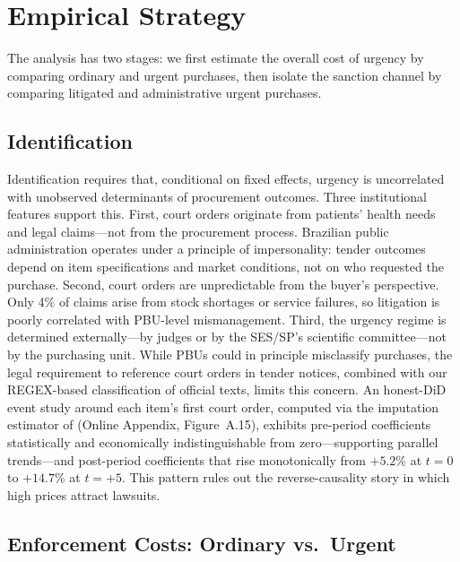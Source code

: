 \section{Empirical Strategy}
\label{sec:empirical}

The analysis has two stages: we first estimate the overall cost of urgency by comparing ordinary and urgent purchases, then isolate the sanction channel by comparing litigated and administrative urgent purchases.

\subsection{Identification}

Identification requires that, conditional on fixed effects, urgency is uncorrelated with unobserved determinants of procurement outcomes. Three institutional features support this. First, court orders originate from patients' health needs and legal claims---not from the procurement process. Brazilian public administration operates under a principle of impersonality: tender outcomes depend on item specifications and market conditions, not on who requested the purchase. Second, court orders are unpredictable from the buyer's perspective. Only 4\% of claims arise from stock shortages or service failures, so litigation is poorly correlated with PBU-level mismanagement. Third, the urgency regime is determined externally---by judges or by the SES/SP's scientific committee---not by the purchasing unit. While PBUs could in principle misclassify purchases, the legal requirement to reference court orders in tender notices, combined with our REGEX-based classification of official texts, limits this concern. An honest-DiD event study around each item's first court order, computed via the imputation estimator of \citet{borusyak2024revisiting} (Online Appendix, Figure~A.15), exhibits pre-period coefficients statistically and economically indistinguishable from zero---supporting parallel trends---and post-period coefficients that rise monotonically from $+5.2\%$ at $t=0$ to $+14.7\%$ at $t=+5$. This pattern rules out the reverse-causality story in which high prices attract lawsuits.

\subsection{Enforcement Costs: Ordinary vs.\ Urgent}

